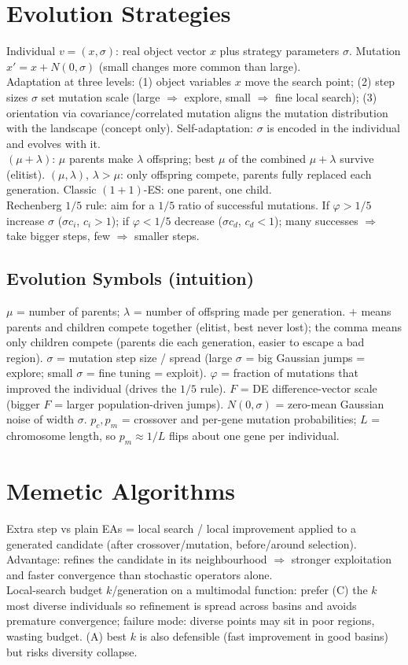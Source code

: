 \section{Evolution Strategies}
Individual \(v=(x,\sigma)\): real object vector \(x\) plus strategy parameters \(\sigma\). Mutation \(x'=x+N(0,\sigma)\) (small changes more common than large).\\
Adaptation at three levels: (1) object variables \(x\) move the search point; (2) step sizes \(\sigma\) set mutation scale (large \(\Rightarrow\) explore, small \(\Rightarrow\) fine local search); (3) orientation via covariance/correlated mutation aligns the mutation distribution with the landscape (concept only). Self-adaptation: \(\sigma\) is encoded in the individual and evolves with it.\\
\((\mu+\lambda)\): \(\mu\) parents make \(\lambda\) offspring; best \(\mu\) of the combined \(\mu+\lambda\) survive (elitist). \((\mu,\lambda)\), \(\lambda>\mu\): only offspring compete, parents fully replaced each generation. Classic \((1+1)\)-ES: one parent, one child.\\
Rechenberg \(1/5\) rule: aim for a \(1/5\) ratio of successful mutations. If \(\varphi>1/5\) increase \(\sigma\) (\(\sigma c_i\), \(c_i>1\)); if \(\varphi<1/5\) decrease (\(\sigma c_d\), \(c_d<1\)); many successes \(\Rightarrow\) take bigger steps, few \(\Rightarrow\) smaller steps.

\subsection*{Evolution Symbols (intuition)}
\(\mu\) = number of parents; \(\lambda\) = number of offspring made per generation. \(+\) means parents and children compete together (elitist, best never lost); the comma means only children compete (parents die each generation, easier to escape a bad region). \(\sigma\) = mutation step size / spread (large \(\sigma\) = big Gaussian jumps = explore; small \(\sigma\) = fine tuning = exploit). \(\varphi\) = fraction of mutations that improved the individual (drives the \(1/5\) rule). \(F\) = DE difference-vector scale (bigger \(F\) = larger population-driven jumps). \(N(0,\sigma)\) = zero-mean Gaussian noise of width \(\sigma\). \(p_c,p_m\) = crossover and per-gene mutation probabilities; \(L\) = chromosome length, so \(p_m\approx1/L\) flips about one gene per individual.

\section{Memetic Algorithms}
Extra step vs plain EAs = local search / local improvement applied to a generated candidate (after crossover/mutation, before/around selection). Advantage: refines the candidate in its neighbourhood \(\Rightarrow\) stronger exploitation and faster convergence than stochastic operators alone.\\
Local-search budget \(k\)/generation on a multimodal function: prefer (C) the \(k\) most diverse individuals so refinement is spread across basins and avoids premature convergence; failure mode: diverse points may sit in poor regions, wasting budget. (A) best \(k\) is also defensible (fast improvement in good basins) but risks diversity collapse.
